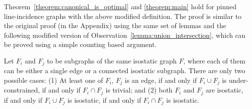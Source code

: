 Theorem~\ref{theorem:canonical_is_optimal} and \ref{theorem:main}
hold for  pinned line-incidence graphs with the above modified definition. 
The proof is similar to the original proof (in the Appendix) using the same set of lemmas and  
%
%
the following modified version of Observation~\ref{lemma:union_intersection},
which  can be proved using a simple counting based argument.


\begin{observation}\label{lem:pinned_union_intersection}
Let $F_i$ and $F_j$ to be subgraphs of the same isostatic graph $F$,
where each of them can be either a single edge or a connected isostatic subgraph.
There are only two possible cases:
(1) At least one of $F_i$, $F_j$ is an edge, if and only if $F_i \cup F_j$ is under-constrained, if and only if $F_i \cap F_j$ is trivial; and (2) both $F_i$ and $F_j$ are isostatic, if and only if $F_i \cup F_j$ is isostatic, if and only if $F_i \cap F_j$ is isostatic.
\end{observation}


